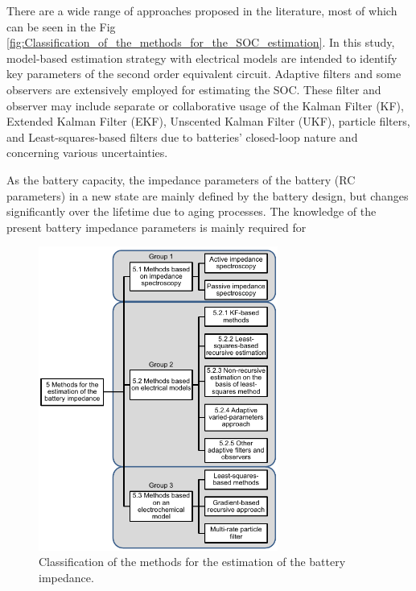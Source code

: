 \documentclass[12pt]{article}
\begin{document}
\par \noindent There are a wide range of
approaches proposed in the 
literature, most of which can be seen in the Fig \ref{fig:Classification_of_the_methods_for_the_SOC_estimation}. In this study, model-based estimation strategy with electrical models are intended to identify key parameters of the second order equivalent circuit. Adaptive filters and some observers are extensively employed for estimating the SOC. These filter and observer may include separate or collaborative usage of the Kalman Filter (KF), Extended Kalman Filter (EKF), Unscented Kalman Filter (UKF), particle filters, and Least-squares-based filters  due to batteries' closed-loop nature
and concerning various uncertainties. \newline 

\par \noindent As the battery capacity, the impedance parameters of the battery (RC parameters) in a new state are mainly defined by the battery design, but changes significantly over the lifetime due to aging processes. The knowledge of the present battery impedance parameters is mainly required for

\begin{figure}[t!]
	\centering
	\includegraphics[width=0.70\textwidth, keepaspectratio]{images/Classification_of_the_methods_for_the_estimation_of_the_battery_impedance.pdf}
	\caption{Classification of the methods for the estimation of the battery impedance.\cite{WaaG2014}}
	\label{fig:Classification_of_the_methods_for_the_estimation_of_the_battery_impedance}
\end{figure}
\end{document}
